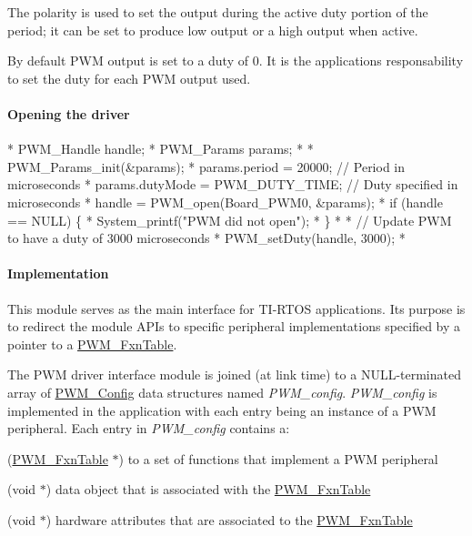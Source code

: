 The polarity is used to set the output during the active duty portion of the period; it can be set to produce low output or a high output when active.

By default P\-W\-M output is set to a duty of 0. It is the applications responsability to set the duty for each P\-W\-M output used.

\paragraph*{Opening the driver}


\begin{DoxyCode}
*  PWM_Handle      handle;
*  PWM_Params      params;
*
*  PWM_Params_init(&params);
*  params.period = 20000;             \textcolor{comment}{// Period in microseconds}
*  params.dutyMode = PWM_DUTY_TIME;   \textcolor{comment}{// Duty specified in microseconds}
*  handle = PWM_open(Board\_PWM0, &params);
*  \textcolor{keywordflow}{if} (handle == NULL) \{
*      System\_printf(\textcolor{stringliteral}{"PWM did not open"});
*  \}
*
*  \textcolor{comment}{// Update PWM to have a duty of 3000 microseconds}
*  PWM_setDuty(handle, 3000);
*  
\end{DoxyCode}


\paragraph*{Implementation}

This module serves as the main interface for T\-I-\/\-R\-T\-O\-S applications. Its purpose is to redirect the module A\-P\-Is to specific peripheral implementations specified by a pointer to a \hyperlink{struct_p_w_m___fxn_table}{P\-W\-M\-\_\-\-Fxn\-Table}.

The P\-W\-M driver interface module is joined (at link time) to a N\-U\-L\-L-\/terminated array of \hyperlink{struct_p_w_m___config}{P\-W\-M\-\_\-\-Config} data structures named {\itshape P\-W\-M\-\_\-config}. {\itshape P\-W\-M\-\_\-config} is implemented in the application with each entry being an instance of a P\-W\-M peripheral. Each entry in {\itshape P\-W\-M\-\_\-config} contains a\-:
\begin{DoxyItemize}
\item (\hyperlink{struct_p_w_m___fxn_table}{P\-W\-M\-\_\-\-Fxn\-Table} $\ast$) to a set of functions that implement a P\-W\-M peripheral
\item (void $\ast$) data object that is associated with the \hyperlink{struct_p_w_m___fxn_table}{P\-W\-M\-\_\-\-Fxn\-Table}
\item (void $\ast$) hardware attributes that are associated to the \hyperlink{struct_p_w_m___fxn_table}{P\-W\-M\-\_\-\-Fxn\-Table}
\end{DoxyItemize}

